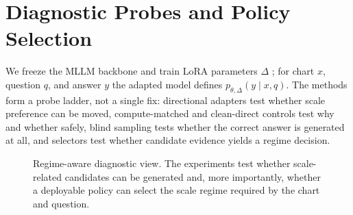 \section{Diagnostic Probes and Policy Selection}

We freeze the MLLM backbone and train LoRA parameters $\Delta$ \citep{hu2021lora}; for chart $x$, question $q$, and answer $y$ the adapted model defines $p_{\theta,\Delta}(y\mid x,q)$. The methods form a probe ladder, not a single fix: directional adapters test whether scale preference can be moved, compute-matched and clean-direct controls test why and whether safely, blind sampling tests whether the correct answer is generated at all, and selectors test whether candidate evidence yields a regime decision.

\begin{figure}[t]
\centering
\small
\setlength{\fboxsep}{4pt}
\caption{Regime-aware diagnostic view. The experiments test whether scale-related candidates can be generated and, more importantly, whether a deployable policy can select the scale regime required by the chart and question.}
\label{fig:regime_pipeline}
\end{figure}

